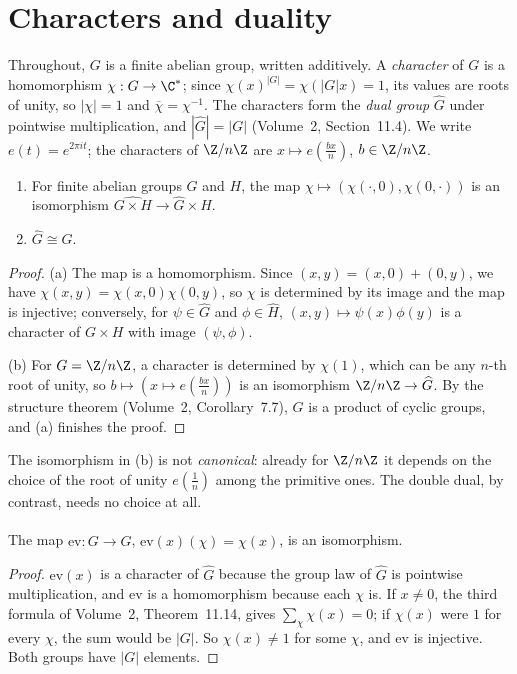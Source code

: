 \section{Characters and duality}

Throughout, $G$ is a finite abelian group, written additively. A \emph{character} of $G$ is a homomorphism $\chi:G\to\C^*$; since
$\chi(x)^{|G|}=\chi(|G|x)=1$, its values are roots of unity, so $|\chi|=1$ and $\overline{\chi}=\chi^{-1}$. The characters form the
\emph{dual group} $\widehat G$ under pointwise multiplication, and $|\widehat G|=|G|$ (Volume~2, Section~11.4). We write $e(t)=e^{2\pi it}$; the
characters of $\Z/n\Z$ are $x\mapsto e(\frac{bx}n)$, $b\in\Z/n\Z$.

\begin{proposition}\label{prop:dualprod}
\begin{enumerate}
\item[(a)] For finite abelian groups $G$ and $H$, the map $\chi\mapsto(\chi(\cdot,0),\chi(0,\cdot))$ is an isomorphism $\widehat{G\times H}\to\widehat G\times\widehat H$.
\item[(b)] $\widehat G\cong G$.
\end{enumerate}
\end{proposition}
\begin{proof}
(a) The map is a homomorphism. Since $(x,y)=(x,0)+(0,y)$, we have $\chi(x,y)=\chi(x,0)\chi(0,y)$, so $\chi$ is determined by its image
and the map is injective; conversely, for $\psi\in\widehat G$ and $\phi\in\widehat H$, $(x,y)\mapsto\psi(x)\phi(y)$ is a character of
$G\times H$ with image $(\psi,\phi)$.

(b) For $G=\Z/n\Z$, a character is determined by $\chi(1)$, which can be any $n$-th root of unity, so $b\mapsto(x\mapsto e(\frac{bx}n))$
is an isomorphism $\Z/n\Z\to\widehat G$. By the structure theorem (Volume~2, Corollary~7.7), $G$ is a product of cyclic groups, and (a)
finishes the proof.
\end{proof}

The isomorphism in (b) is not \emph{canonical}: already for $\Z/n\Z$ it depends on the choice of the root of unity $e(\frac1n)$ among the
primitive ones. The double dual, by contrast, needs no choice at all.

\begin{theorem}[duality]\label{thm:finiteduality}
The map $\mathrm{ev}:G\to\widehat{\widehat G}$, $\mathrm{ev}(x)(\chi)=\chi(x)$, is an isomorphism.
\end{theorem}
\begin{proof}
$\mathrm{ev}(x)$ is a character of $\widehat G$ because the group law of $\widehat G$ is pointwise multiplication, and $\mathrm{ev}$ is a
homomorphism because each $\chi$ is. If $x\ne0$, the third formula of Volume~2, Theorem~11.14, gives $\sum_{\chi}\chi(x)=0$; if
$\chi(x)$ were $1$ for every $\chi$, the sum would be $|G|$. So $\chi(x)\ne1$ for some $\chi$, and $\mathrm{ev}$ is injective. Both groups have $|G|$ elements.
\end{proof}

